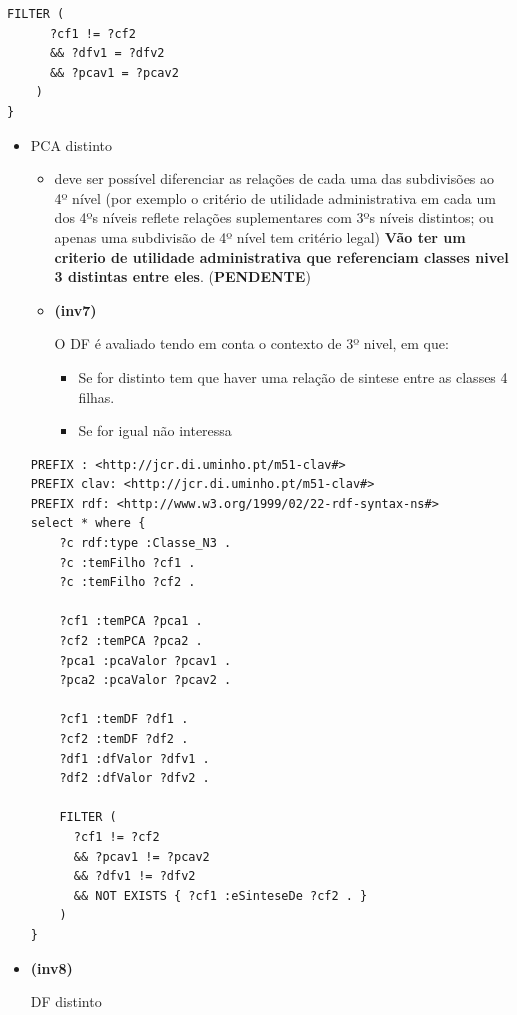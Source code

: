 \documentclass[tikz,runningheads,a4paper]{llncs}
\begin{document}
\begin{subappendices}
\begin{itemize}
\begin{lstlisting}[language=sparql, frame=single, basicstyle=\scriptsize]
    FILTER (
      ?cf1 != ?cf2
      && ?dfv1 = ?dfv2
      && ?pcav1 = ?pcav2
    )
}
\end{lstlisting}

  \begin{itemize}
  \tightlist
  \item
    PCA distinto

    \begin{itemize}
    \tightlist
    \item
      deve ser possível diferenciar as relações de cada uma das
      subdivisões ao 4º nível (por exemplo o critério de utilidade
      administrativa em cada um dos 4ºs níveis reflete relações
      suplementares com 3ºs níveis distintos; ou apenas uma subdivisão
      de 4º nível tem critério legal) \textbf{Vão ter um criterio de
      utilidade administrativa que referenciam classes nivel 3 distintas
      entre eles}. (\textbf{PENDENTE})
    \item
      \hypertarget{inv7}{\textbf{(inv7)}} O DF é avaliado tendo em conta o contexto de 3º
      nivel, em que:

      \begin{itemize}
      \tightlist
      \item
        Se for distinto tem que haver uma relação de sintese entre as
        classes 4 filhas.
      \item
        Se for igual não interessa
      \end{itemize}
    \end{itemize}

\begin{lstlisting}[language=sparql, frame=single, basicstyle=\scriptsize]
PREFIX : <http://jcr.di.uminho.pt/m51-clav#>
PREFIX clav: <http://jcr.di.uminho.pt/m51-clav#>
PREFIX rdf: <http://www.w3.org/1999/02/22-rdf-syntax-ns#>
select * where { 
    ?c rdf:type :Classe_N3 .
    ?c :temFilho ?cf1 .
    ?c :temFilho ?cf2 .

    ?cf1 :temPCA ?pca1 .
    ?cf2 :temPCA ?pca2 .
    ?pca1 :pcaValor ?pcav1 .
    ?pca2 :pcaValor ?pcav2 .

    ?cf1 :temDF ?df1 .
    ?cf2 :temDF ?df2 .
    ?df1 :dfValor ?dfv1 .
    ?df2 :dfValor ?dfv2 .

    FILTER (
      ?cf1 != ?cf2
      && ?pcav1 != ?pcav2
      && ?dfv1 != ?dfv2
      && NOT EXISTS { ?cf1 :eSinteseDe ?cf2 . }
    )
}
\end{lstlisting}
  \item
    \hypertarget{inv8}{\textbf{(inv8)}} DF distinto


\end{itemize}
\end{itemize}
\end{subappendices}
\end{document}
